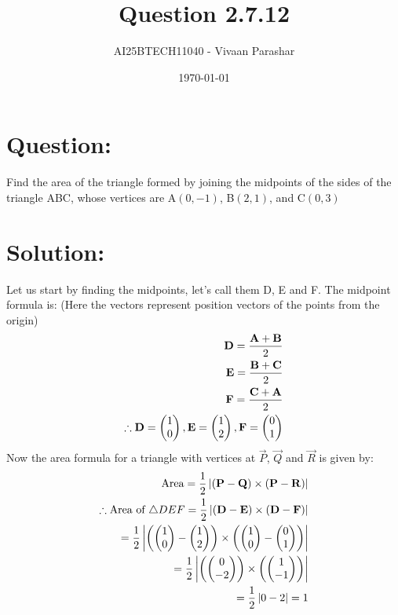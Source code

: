 \documentclass[a4paper, 12pt]{article}
\title{Question 2.7.12}
\author{AI25BTECH11040 - Vivaan Parashar}
\date{\today}
\begin{document}
\maketitle

\section{Question: }
Find the area of the triangle formed by joining the midpoints of the sides of the triangle ABC, whose vertices are A$(0, -1)$, B$(2, 1)$, and C$(0, 3)$

\section{Solution: }
Let us start by finding the midpoints, let's call them D, E and F.
The midpoint formula is: (Here the vectors represent position vectors of the points from the origin)
\begin{align}
    \mathbf{D} = \frac{\mathbf{A}+\mathbf{B}}{2} \\
    \mathbf{E} = \frac{\mathbf{B}+\mathbf{C}}{2} \\
    \mathbf{F} = \frac{\mathbf{C}+\mathbf{A}}{2} \\
    \therefore \mathbf{D} = \begin{pmatrix}1       \\ 0\end{pmatrix}, \mathbf{E} = \begin{pmatrix}1 \\ 2\end{pmatrix}, \mathbf{F} = \begin{pmatrix}0 \\ 1\end{pmatrix}
\end{align}
Now the area formula for a triangle with vertices at $\vec{P}$, $\vec{Q}$ and $\vec{R}$ is given by:
\begin{align}
    \text{Area} = \frac{1}{2} \left| (\mathbf{P} - \mathbf{Q}) \times (\mathbf{P} - \mathbf{R}) \right|                              \\
    \therefore \text{Area of } \triangle DEF = \frac{1}{2} \left| (\mathbf{D} - \mathbf{E}) \times (\mathbf{D} - \mathbf{F}) \right| \\
    = \frac{1}{2} \left| \left( \begin{pmatrix}1                                                                                 \\ 0\end{pmatrix} - \begin{pmatrix}1 \\ 2\end{pmatrix} \right) \times \left( \begin{pmatrix}1 \\ 0\end{pmatrix} - \begin{pmatrix}0 \\ 1\end{pmatrix} \right) \right|\\
    = \frac{1}{2} \left| \left( \begin{pmatrix}0                                                                                 \\ -2\end{pmatrix} \right) \times \left( \begin{pmatrix}1 \\ -1\end{pmatrix} \right) \right|\\
    = \frac{1}{2} \left| 0 - 2 \right| = 1
\end{align}
\end{document}
